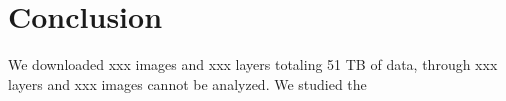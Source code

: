 \section{Conclusion}
\label{sec:conclusion}

We downloaded xxx images and xxx layers totaling 51 TB of data, through xxx layers and xxx images cannot be analyzed.
We studied the    
